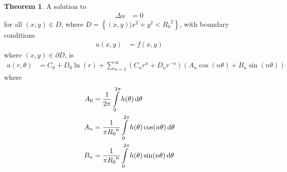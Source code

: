 \documentclass[titlepage, fleqn, a4paper, 12pt, twoside]{article}
\theoremstyle{definition}
\theoremstyle{theorem}
\newtheorem{theorem}{Theorem}
\begin{document}
\begin{theorem}
	A solution to
	\begin{align*}
		\Delta u & = 0
	\end{align*}
	for all $(x,y) \in D$, where $D = \left\{ (x,y) | x^2 + y^2 < {R_0}^2 \right\}$, with boundary conditions
	\begin{align*}
		u(x,y) & = f(x,y)
	\end{align*}
	where $(x,y) \in \partial D$, is
	\begin{align*}
		u(r,\theta) & = C_0 + D_0 \ln(r) + \sum\limits_{n = 1}^{\infty} \left( C_n r^n + D_n r^{-n} \right) \left( A_n \cos(n \theta) + B_n \sin(n \theta) \right)
	\end{align*}
	where
	\begin{align*}
		A_0 & = \frac{1}{2 \pi} \int\limits_{0}^{2 \pi} h(\theta) \dif \theta                      \\
		A_n & = \frac{1}{\pi {R_0}^n} \int\limits_{0}^{2 \pi} h(\theta) \cos(n \theta) \dif \theta \\
		B_n & = \frac{1}{\pi {R_0}^n} \int\limits_{0}^{2 \pi} h(\theta) \sin(n \theta) \dif \theta
	\end{align*}
\end{theorem}
\end{document}
